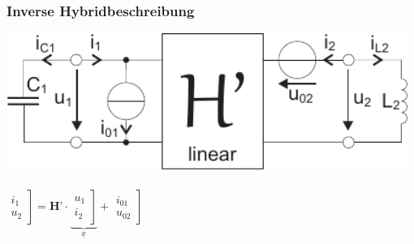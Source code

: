 \documentclass[a4paper,twocolumn,10pt]{article}
\begin{document}
\hfill
\begin{minipage}[t]{0.23\textwidth}
\subsubsection*{Inverse Hybridbeschreibung}
\includegraphics[width=0.98\textwidth]{img/ESBzweitenGrades4}\\\\
$\left.\begin{matrix}i_1 \\ u_2\end{matrix}\right]=\textbf{H'}\cdot \underbrace{\left.\begin{matrix}u_1 \\ i_2\end{matrix}\right]}_{\underline{x}}+\left.\begin{matrix}i_{01} \\ u_{02}\end{matrix}\right]$
\end{minipage}
\end{document}
